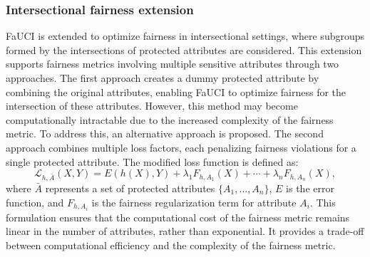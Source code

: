 \subsubsection{Intersectional fairness extension}\label{subsubsec:intersectional-fairness}
%
\Gls{FaUCI} is extended to optimize fairness in intersectional settings, where subgroups formed by the intersections of protected attributes are considered.
%
This extension supports fairness metrics involving multiple sensitive attributes through two approaches.
%
The first approach creates a dummy protected attribute by combining the original attributes, enabling \gls{FaUCI} to optimize fairness for the intersection of these attributes.
%
However, this method may become computationally intractable due to the increased complexity of the fairness metric.
%
To address this, an alternative approach is proposed.
%
The second approach combines multiple loss factors, each penalizing fairness violations for a single protected attribute.
%
The modified loss function is defined as:
%
\begin{equation}
    \label{eq:intersectional_loss}
    \mathcal{L}_{h,\bar{A}}(X, Y) = E(h(X), Y) + \lambda_1 F_{h,A_1}(X) + \cdots + \lambda_n F_{h,A_n}(X),
\end{equation}
%
where \(\bar{A}\) represents a set of protected attributes \(\{A_1, \ldots, A_n\}\), \(E\) is the error function, and \(F_{h,A_i}\) is the fairness regularization term for attribute \(A_i\).
%
This formulation ensures that the computational cost of the fairness metric remains linear in the number of attributes, rather than exponential.
%
It provides a trade-off between computational efficiency and the complexity of the fairness metric.
%
